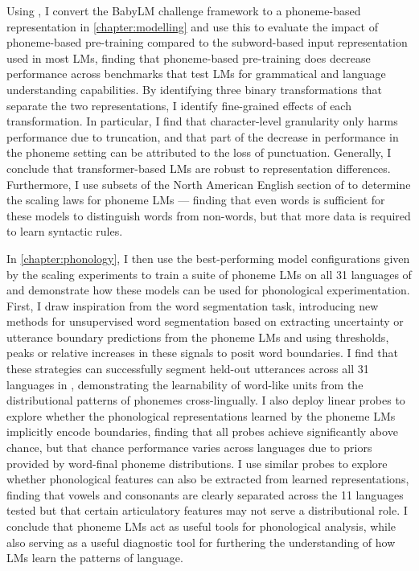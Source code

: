 Using \gpp, I convert the BabyLM challenge framework to a phoneme-based representation in \cref{chapter:modelling} and use this to evaluate the impact of phoneme-based pre-training compared to the subword-based input representation used in most LMs, finding that phoneme-based pre-training does decrease performance across benchmarks that test LMs for grammatical and language understanding capabilities. By identifying three binary transformations that separate the two representations, I identify fine-grained effects of each transformation. In particular, I find that character-level granularity only harms performance due to truncation, and that part of the decrease in performance in the phoneme setting can be attributed to the loss of punctuation. Generally, I conclude that transformer-based LMs are robust to representation differences. Furthermore, I use subsets of the North American English section of \ipachildes to determine the scaling laws for phoneme LMs --- finding that even  words is sufficient for these models to distinguish words from non-words, but that more data is required to learn syntactic rules.

In \cref{chapter:phonology}, I then use the best-performing model configurations given by the scaling experiments to train a suite of phoneme LMs on all 31 languages of \ipachildes and demonstrate how these models can be used for phonological experimentation. First, I draw inspiration from the word segmentation task, introducing new methods for unsupervised word segmentation based on extracting uncertainty or utterance boundary predictions from the phoneme LMs and using thresholds, peaks or relative increases in these signals to posit word boundaries. I find that these strategies can successfully segment held-out utterances across all 31 languages in \ipachildes, demonstrating the learnability of word-like units from the distributional patterns of phonemes cross-lingually. I also deploy linear probes to explore whether the phonological representations learned by the phoneme LMs implicitly encode boundaries, finding that all probes achieve significantly above chance, but that chance performance varies across languages due to priors provided by word-final phoneme distributions. I use similar probes to explore whether phonological features can also be extracted from learned representations, finding that vowels and consonants are clearly separated across the 11 languages tested but that certain articulatory features may not serve a distributional role. I conclude that phoneme LMs act as useful tools for phonological analysis, while also serving as a useful diagnostic tool for furthering the understanding of how LMs learn the patterns of language.

